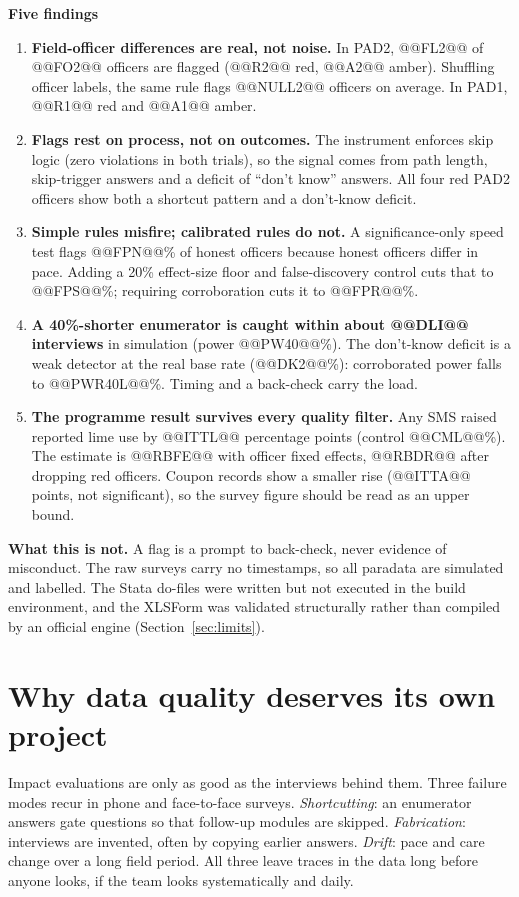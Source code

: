 \documentclass[11pt,a4paper]{article}
\begin{document}
\begin{callout}
\textbf{Five findings}
\begin{enumerate}
\item \textbf{Field-officer differences are real, not noise.} In PAD2, @@FL2@@ of @@FO2@@ officers are flagged (@@R2@@ red, @@A2@@ amber). Shuffling officer labels, the same rule flags @@NULL2@@ officers on average. In PAD1, @@R1@@ red and @@A1@@ amber.
\item \textbf{Flags rest on process, not on outcomes.} The instrument enforces skip logic (zero violations in both trials), so the signal comes from path length, skip-trigger answers and a deficit of ``don't know'' answers. All four red PAD2 officers show both a shortcut pattern and a don't-know deficit.
\item \textbf{Simple rules misfire; calibrated rules do not.} A significance-only speed test flags @@FPN@@\% of honest officers because honest officers differ in pace. Adding a 20\% effect-size floor and false-discovery control cuts that to @@FPS@@\%; requiring corroboration cuts it to @@FPR@@\%.
\item \textbf{A 40\%-shorter enumerator is caught within about @@DLI@@ interviews} in simulation (power @@PW40@@\%). The don't-know deficit is a weak detector at the real base rate (@@DK2@@\%): corroborated power falls to @@PWR40L@@\%. Timing and a back-check carry the load.
\item \textbf{The programme result survives every quality filter.} Any SMS raised reported lime use by @@ITTL@@ percentage points (control @@CML@@\%). The estimate is @@RBFE@@ with officer fixed effects, @@RBDR@@ after dropping red officers. Coupon records show a smaller rise (@@ITTA@@ points, not significant), so the survey figure should be read as an upper bound.
\end{enumerate}
\end{callout}

\textbf{What this is not.} A flag is a prompt to back-check, never evidence of misconduct. The raw surveys carry no timestamps, so all paradata are simulated and labelled. The Stata do-files were written but not executed in the build environment, and the XLSForm was validated structurally rather than compiled by an official engine (Section~\ref{sec:limits}).

\section{Why data quality deserves its own project}
Impact evaluations are only as good as the interviews behind them. Three failure modes recur in phone and face-to-face surveys. \emph{Shortcutting}: an enumerator answers gate questions so that follow-up modules are skipped. \emph{Fabrication}: interviews are invented, often by copying earlier answers. \emph{Drift}: pace and care change over a long field period. All three leave traces in the data long before anyone looks, if the team looks systematically and daily.
\end{document}
